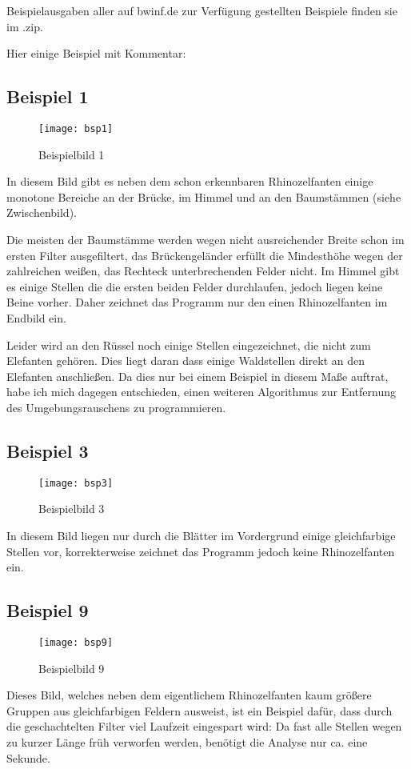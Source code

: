 Beispielausgaben aller auf bwinf.de zur Verfügung gestellten Beispiele finden sie im .zip.

Hier einige Beispiel mit Kommentar:

\subsection{Beispiel 1}

\begin{figure}[h]
	\centering
	\texttt{[image: bsp1]}
	\caption {Beispielbild 1}
\end{figure}

In diesem Bild gibt es neben dem schon erkennbaren Rhinozelfanten einige monotone Bereiche an der Brücke, im Himmel und an den Baumstämmen (siehe Zwischenbild).

Die meisten der Baumstämme werden wegen nicht ausreichender Breite schon im ersten Filter ausgefiltert, das Brückengeländer erfüllt die Mindesthöhe wegen der zahlreichen weißen, das Rechteck unterbrechenden Felder nicht. Im Himmel gibt es einige Stellen die die ersten beiden Felder durchlaufen, jedoch liegen keine Beine vorher. Daher zeichnet das Programm nur den einen Rhinozelfanten im Endbild ein.

Leider wird an den Rüssel noch einige Stellen eingezeichnet, die nicht zum Elefanten gehören. Dies liegt daran dass einige Waldstellen direkt an den Elefanten anschließen. Da dies nur bei einem Beispiel in diesem Maße auftrat, habe ich mich dagegen entschieden, einen weiteren Algorithmus zur Entfernung des Umgebungsrauschens zu programmieren.

\subsection{Beispiel 3}

\begin{figure}[h]
	\centering
	\texttt{[image: bsp3]}
	\caption {Beispielbild 3}
\end{figure}

In diesem Bild liegen nur durch die Blätter im Vordergrund einige gleichfarbige Stellen vor, korrekterweise zeichnet das Programm jedoch keine Rhinozelfanten ein.

\subsection{Beispiel 9}

\begin{figure}[h]
	\centering
	\texttt{[image: bsp9]}
	\caption {Beispielbild 9}
\end{figure}

Dieses Bild, welches neben dem eigentlichem Rhinozelfanten kaum größere Gruppen aus gleichfarbigen Feldern ausweist, ist ein Beispiel dafür, dass durch die geschachtelten Filter viel Laufzeit eingespart wird: Da fast alle Stellen wegen zu kurzer Länge früh verworfen werden, benötigt die Analyse nur ca. eine Sekunde.